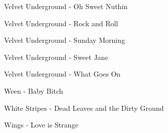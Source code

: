 Velvet Underground - Oh Sweet Nuthin \dotfill \pageref{Oh Sweet Nuthin - Velvet Underground} 

Velvet Underground - Rock and Roll \dotfill \pageref{Rock and Roll - Velvet Underground} 

Velvet Underground - Sunday Morning \dotfill \pageref{Sunday Morning - Velvet Underground} 

Velvet Underground - Sweet Jane \dotfill \pageref{Sweet Jane - Velvet Underground} 

Velvet Underground - What Goes On \dotfill \pageref{What Goes On - Velvet Underground} 

Ween - Baby Bitch \dotfill \pageref{Baby Bitch - Ween} 

White Stripes - Dead Leaves and the Dirty Ground \dotfill \pageref{Dead Leaves and the Dirty Ground - White Stripes} 

Wings - Love is Strange \dotfill \pageref{Love is Strange - Wings} 

